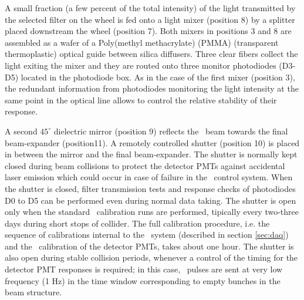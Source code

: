  A small fraction (a few percent of the total intensity) of the light transmitted by
the selected filter on the wheel is fed onto a light mixer (position 8) by a
splitter placed downstream the wheel (position 7). Both mixers in positions 3 and 8
are assembled as a wafer of a Poly(methyl methacrylate) (PMMA) (transparent thermoplastic) optical guide between silica diffusers.
Three clear fibers collect the light exiting the mixer and they are routed onto
three monitor photodiodes (D3-D5) located in the photodiode box. As in the case of the
first mixer (position 3), the redundant information from photodiodes monitoring the
light intensity at the same point in the optical line allows to control the relative
stability of their response. 

A second $45^{\circ}$ dielectric mirror (position 9) reflects the \laser~beam towards
the final beam-expander (position11). A remotely controlled shutter (position 10) is
placed in between the mirror and the final beam-expander. The shutter is normally
kept closed during beam collisions to protect the detector PMTs against accidental
laser emission which could occur in case of failure in the \laser~control system. When the
shutter is closed, filter transmission tests and response checks of photodiodes
D0 to D5 can be performed even during normal data taking. The shutter is open only
when the standard \laser~calibration runs are performed, tipically every two-three
days during short stops of collider. The full calibration procedure, i.e. the sequence
of calibrations internal to the \laser~system (described in section \ref{sec:daq}) and the
\laser~calibration of the detector PMTs, takes about one hour. The shutter is also
open during stable collision periods, whenever a control of the timing for the
detector PMT responses is required; in this case, \laser~pulses are sent at very low
frequency (1 Hz) in the time window corresponding to empty bunches in the beam structure. 

